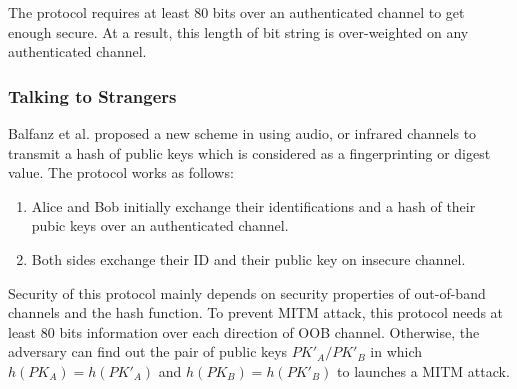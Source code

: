 The protocol requires at least 80 bits over an authenticated channel to get enough secure. At a result, this length of bit string is over-weighted on any authenticated channel. 
 
\subsubsection{Talking to Strangers}

Balfanz et al. proposed a new scheme in \cite{Smetters02talkingto} using audio, or infrared channels to transmit a hash of public keys which is considered as a fingerprinting or digest value. The protocol works as follows:
\begin{enumerate}
\item Alice and Bob initially exchange their identifications and a hash of their pubic keys over an authenticated channel.
\item Both sides exchange their ID and their public key on insecure channel. 
\end{enumerate}

\begin{center}
\end{center}

Security of this protocol mainly depends on security properties of out-of-band channels and the hash function. To prevent MITM attack, this protocol needs at least 80 bits information over each direction of OOB channel. Otherwise, the adversary can find out the pair of public keys $PK'_A/PK'_B$ in which $h(PK_A) = h(PK'_A)$ and $h(PK_B) = h(PK'_B)$ to launches a MITM attack.

